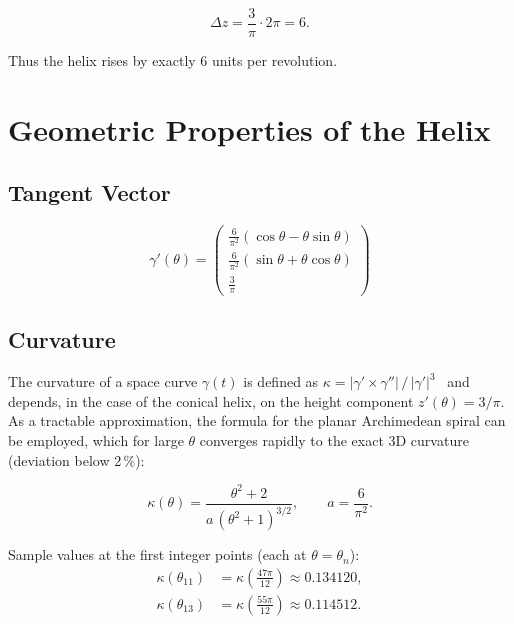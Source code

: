 \begin{equation}
\Delta z = \frac{3}{\pi} \cdot 2\pi = 6.
\end{equation}

Thus the helix rises by exactly 6 units per revolution.

\section{Geometric Properties of the Helix}

\subsection{Tangent Vector}

\begin{equation}
\gamma'(\theta) =
\begin{pmatrix}
\frac{6}{\pi^2}(\cos\theta - \theta\sin\theta) \\[8pt]
\frac{6}{\pi^2}(\sin\theta + \theta\cos\theta) \\[8pt]
\frac{3}{\pi}
\end{pmatrix}
\end{equation}

\subsection{Curvature}

\begin{remark}
The curvature of a space curve $\gamma(t)$ is defined as
$\kappa = |\gamma' \times \gamma''| \, / \, |\gamma'|^3$~\cite{doCarmo1976,Struik1988} and depends, in the case of the
conical helix, on the height component $z'(\theta) = 3/\pi$. As
a tractable approximation, the formula for the planar Archimedean spiral
can be employed, which for large $\theta$ converges rapidly to the exact
3D curvature (deviation below 2\,\%):
\end{remark}

\begin{equation}
\kappa(\theta)
= \frac{\theta^2 + 2}{a\,(\theta^2 + 1)^{3/2}},
\qquad
a = \frac{6}{\pi^2}.
\end{equation}

Sample values at the first integer points (each at $\theta = \theta_n$):
\begin{align}
\kappa(\theta_{11}) &= \kappa\!\left(\tfrac{47\pi}{12}\right) \approx 0.134120, \\
\kappa(\theta_{13}) &= \kappa\!\left(\tfrac{55\pi}{12}\right) \approx 0.114512.
\end{align}

